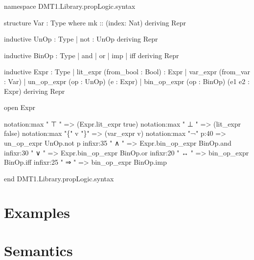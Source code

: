 \documentclass{book}
\newenvironment{Shaded}{\begin{snugshade}}{\end{snugshade}}
\newcommand{\NormalTok}[1]{#1}
\begin{document}
\begin{Shaded}
\begin{Highlighting}[]
\NormalTok{namespace DMT1.Library.propLogic.syntax}

\NormalTok{structure Var : Type where}
\NormalTok{  mk :: (index: Nat)}
\NormalTok{deriving Repr}

\NormalTok{inductive UnOp : Type}
\NormalTok{| not : UnOp}
\NormalTok{deriving Repr}

\NormalTok{inductive BinOp : Type}
\NormalTok{| and}
\NormalTok{| or}
\NormalTok{| imp}
\NormalTok{| iff}
\NormalTok{deriving Repr}

\NormalTok{inductive Expr : Type}
\NormalTok{| lit\_expr (from\_bool : Bool) : Expr}
\NormalTok{| var\_expr (from\_var : Var)}
\NormalTok{| un\_op\_expr (op : UnOp) (e : Expr)}
\NormalTok{| bin\_op\_expr (op : BinOp) (e1 e2 : Expr)}
\NormalTok{deriving Repr}

\NormalTok{open Expr}

\NormalTok{notation:max " ⊤ " =\textgreater{} (Expr.lit\_expr true)}
\NormalTok{notation:max " ⊥ " =\textgreater{} (lit\_expr false)}
\NormalTok{notation:max "\{" v "\}" =\textgreater{} (var\_expr v)}
\NormalTok{notation:max "¬" p:40 =\textgreater{} un\_op\_expr UnOp.not p}
\NormalTok{infixr:35 " ∧ "  =\textgreater{}  Expr.bin\_op\_expr BinOp.and}
\NormalTok{infixr:30 " ∨  "  =\textgreater{} Expr.bin\_op\_expr BinOp.or}
\NormalTok{infixr:20 " ↔ " =\textgreater{} bin\_op\_expr BinOp.iff}
\NormalTok{infixr:25 " ⇒ " =\textgreater{} bin\_op\_expr BinOp.imp}

\NormalTok{end DMT1.Library.propLogic.syntax}
\end{Highlighting}
\end{Shaded}

\hypertarget{pandoc.profile.debug__pandoc__debug__src__dmt1__lectures__l02_proplogic__formal__axioms.lean.md}{}
\hypertarget{pandoc.profile.debug__pandoc__debug__src__dmt1__lectures__l02_proplogic__formal__axioms.lean.md__examples}{%
\section{Examples}\label{pandoc.profile.debug__pandoc__debug__src__dmt1__lectures__l02_proplogic__formal__axioms.lean.md__examples}}

\hypertarget{pandoc.profile.debug__pandoc__debug__src__dmt1__lectures__l02_proplogic__formal__semantics.lean.md}{}
\hypertarget{pandoc.profile.debug__pandoc__debug__src__dmt1__lectures__l02_proplogic__formal__semantics.lean.md__semantics}{%
\section{Semantics}\label{pandoc.profile.debug__pandoc__debug__src__dmt1__lectures__l02_proplogic__formal__semantics.lean.md__semantics}}
\end{document}
